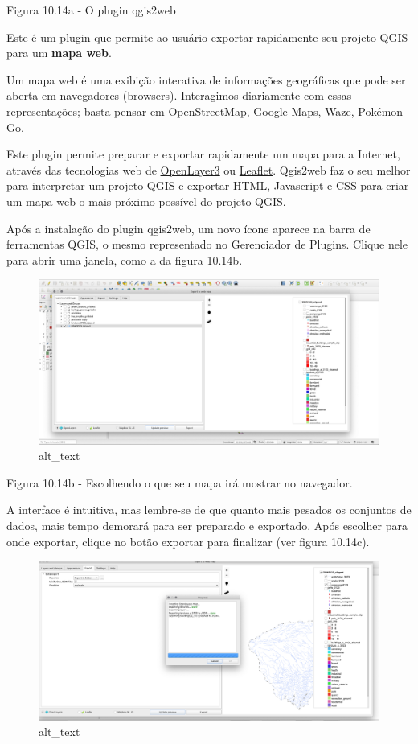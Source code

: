 \documentclass[
  portuguese,
]{krantz}
\begin{document}
Figura 10.14a - O plugin qgis2web

Este é um plugin que permite ao usuário exportar rapidamente seu projeto QGIS para um \textbf{mapa web}.

Um mapa web é uma exibição interativa de informações geográficas que pode ser aberta em navegadores (browsers). Interagimos diariamente com essas representações; basta pensar em OpenStreetMap, Google Maps, Waze, Pokémon Go.

Este plugin permite preparar e exportar rapidamente um mapa para a Internet, através das tecnologias web de \href{https://openlayers.org/}{OpenLayer3} ou \href{https://leafletjs.com/}{Leaflet}. Qgis2web faz o seu melhor para interpretar um projeto QGIS e exportar HTML, Javascript e CSS para criar um mapa web o mais próximo possível do projeto QGIS.

Após a instalação do plugin qgis2web, um novo ícone aparece na barra de ferramentas QGIS, o mesmo representado no Gerenciador de Plugins. Clique nele para abrir uma janela, como a da figura 10.14b.

\begin{figure}
\centering
\includegraphics{media/modulo10/fig1014_b.png}
\caption{alt\_text}
\end{figure}

Figura 10.14b - Escolhendo o que seu mapa irá mostrar no navegador.

A interface é intuitiva, mas lembre-se de que quanto mais pesados \hspace{0pt}\hspace{0pt}os conjuntos de dados, mais tempo demorará para ser preparado e exportado. Após escolher para onde exportar, clique no botão exportar para finalizar (ver figura 10.14c).

\begin{figure}
\centering
\includegraphics{media/modulo10/fig1014_c.png}
\caption{alt\_text}
\end{figure}
\end{document}
